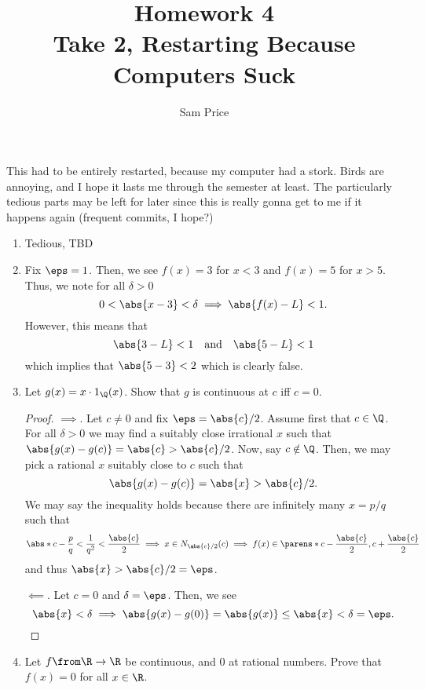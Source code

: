 \documentclass{article}
\author{Sam Price}
\date{}
\title{Homework 4\\\Large{Take 2, Restarting Because Computers Suck}}
\begin{document}
\maketitle

This had to be entirely restarted, because my computer had a stork. Birds are annoying, and I hope it lasts me through the semester at least.
The particularly tedious parts may be left for later since this is really gonna get to me if it happens again (frequent commits, I hope?)

\begin{enumerate}

  \item Tedious, TBD


  \item Fix $\eps = 1$. Then, we see $f(x) = 3$ for $x < 3$ and $f(x) = 5$ for $x > 5$. Thus, we note for all $\delta > 0$
        \[ 0 < \abs{x - 3} < \delta \implies \abs{f(x) - L} < 1. \]
        However, this means that
        \[ \abs{3 - L} < 1 \quad\text{and}\quad \abs{5 - L} < 1 \]
        which implies that $\abs{5 - 3} < 2$ which is clearly false.

  \item Let $g(x) = x \cdot 1_{\Q}(x)$. Show that $g$ is continuous at $c$ iff $c = 0$.

        \begin{proof}
          $\implies$. Let $c \ne 0$ and fix $\eps = \abs{c}/2$. Assume first that $c \in \Q$.
          For all $\delta > 0$ we may find a suitably close irrational $x$ such that $\abs{g(x) - g(c)} = \abs{c} > \abs{c}/2$.
          Now, say $c \notin \Q$. Then, we may pick a rational $x$ suitably close to $c$ such that
          \[ \abs{g(x) - g(c)} = \abs{x} > \abs{c}/2. \]
          We may say the inequality holds because there are infinitely many $x = p/q$ such that
          \[ \abs*{c - \frac{p}{q}} < \frac{1}{q^{2}}
            < \frac{\abs{c}}{2}
            \implies x \in N_{\abs{c}/2}(c) \implies f(x) \in \parens*{ c - \frac{\abs{c}}{2}, c + \frac{\abs{c}}{2} }
          \]
          and thus $\abs{x} > \abs{c}/2 = \eps$.

          $\impliedby$. Let $c = 0$ and $\delta = \eps$. Then, we see
          \[ \abs{x} < \delta \implies \abs{g(x) - g(0)} = \abs{g(x)} \le \abs{x} < \delta = \eps. \]
        \end{proof}
  \item Let $f \from \R \to \R$ be continuous, and 0 at rational numbers. Prove that $f(x) = 0$ for all $x \in \R$.


\end{enumerate}
\end{document}
